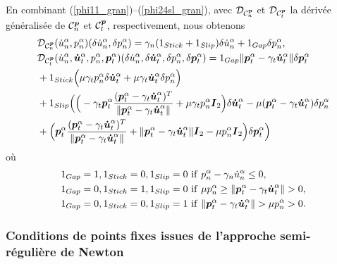 \noindent En combinant (\ref{phi11_gran})--(\ref{phi24sl_gran}), avec ${\cal D}_{{\cal C}_{n}^{\boldsymbol{p}}}$ et ${\cal D}_{{\cal C}_{t}^{\boldsymbol{p}}}$ la dérivée généralisée de  ${\cal C}_{n}^{\boldsymbol{p}}$ et ${\cal C}_{t}^{\boldsymbol{p}}$, respectivement, nous obtenons
\begin{align}
&{\cal D}_{{\cal C}_{n}^{\boldsymbol{p}}}(\dot{u}^{\alpha}_n,p^{\alpha}_n)(\delta \dot{u}^{\alpha}_n,\delta p^{\alpha}_n)= \gamma_n({1}_{Stick}+ {1}_{Slip})\delta \dot{u}^{\alpha}_n + {1}_{Gap} \delta p^{\alpha}_n,\\
&{\cal D}_{{\cal C}_{t}^{\boldsymbol{p}}}(\dot{u}^{\alpha}_n,\boldsymbol{\dot{u}}^{\alpha}_t,p^{\alpha}_n,\boldsymbol{p}^{\alpha}_t)(\delta \dot{u}^{\alpha}_n,\delta\boldsymbol{\dot{u}}^{\alpha}_t,\delta p^{\alpha}_n,\delta\boldsymbol{p}^{\alpha}_t)= {1}_{Gap}\|\boldsymbol{p}^{\alpha}_t - \gamma_t \boldsymbol{\dot{u}}^{\alpha}_t\| \delta\boldsymbol{p}^{\alpha}_t\\
&+ {1}_{Stick} \Big( \mu \gamma_t p^{\alpha}_n \delta{\boldsymbol{\dot{u}}^{\alpha}_t} + \mu \gamma_t \boldsymbol{\dot{u}}^{\alpha}_t\delta p^{\alpha}_n \Big)\nonumber\\
&+ {1}_{Slip} \Big( \Big(- \gamma_t \boldsymbol{p}^{\alpha}_t\frac{(\boldsymbol{p}^{\alpha}_t - \gamma_t \boldsymbol{\dot{u}}^{\alpha}_t)^T}{\|\boldsymbol{p}^{\alpha}_t - \gamma_t \boldsymbol{\dot{u}}^{\alpha}_t\|}+\mu \gamma_t p^{\alpha}_n\mbox{\boldmath{$I$}}_2\Big)\delta{\boldsymbol{\dot{u}}^{\alpha}_t}  - \mu (\boldsymbol{p}^{\alpha}_t - \gamma_t \boldsymbol{\dot{u}}^{\alpha}_t)\delta p^{\alpha}_n\nonumber\\
& +\Big( \boldsymbol{p}^{\alpha}_t\frac{(\boldsymbol{p}^{\alpha}_t - \gamma_t \boldsymbol{\dot{u}}^{\alpha}_t)^T}{\|\boldsymbol{p}^{\alpha}_t - \gamma_t \boldsymbol{\dot{u}}^{\alpha}_t\|} +\|\boldsymbol{p}^{\alpha}_t - \gamma_t \boldsymbol{\dot{u}}^{\alpha}_t\|\mbox{\boldmath{$I$}}_2 - \mu p^{\alpha}_n\mbox{\boldmath{$I$}}_2  \Big)\delta{\boldsymbol{p}^{\alpha}_t} \Big )\nonumber
\end{align}
où 
\begin{align*}
&{1}_{Gap} =1, {1}_{Stick} = 0, {1}_{Slip} = 0\ {\rm if}\ p^{\alpha}_n - \gamma_n \dot{u}^{\alpha}_n\le 0,\\
&{1}_{Gap} =0, {1}_{Stick} = 1, {1}_{Slip} = 0\ {\rm if}\ \mu p^{\alpha}_n\ge \|\vect{p}^{\alpha}_t - \gamma_t \vect{\dot{u}}^{\alpha}_t\|> 0,\\
&{1}_{Gap} =0, {1}_{Stick} = 0,  {1}_{Slip} = 1\ {\rm if}\ \|\vect{p}^{\alpha}_t - \gamma_t \vect{\dot{u}}^{\alpha}_t\|> \mu p^{\alpha}_n> 0.
\end{align*}

\subsubsection{Conditions de points fixes issues de l'approche semi-régulière de Newton}\label{cond_point_fix}

